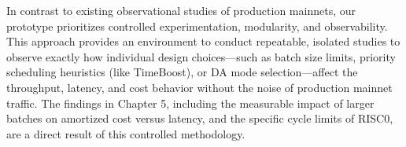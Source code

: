 In contrast to existing observational studies of production mainnets, our prototype prioritizes controlled experimentation, modularity, and observability. This approach provides an environment to conduct repeatable, isolated studies to observe exactly how individual design choices---such as batch size limits, priority scheduling heuristics (like TimeBoost), or DA mode selection---affect the throughput, latency, and cost behavior without the noise of production mainnet traffic. The findings in Chapter 5, including the measurable impact of larger batches on amortized cost versus latency, and the specific cycle limits of RISC0, are a direct result of this controlled methodology.
